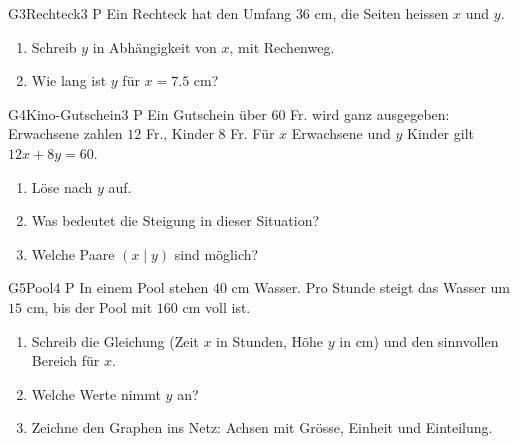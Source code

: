 \documentclass[11pt]{article}
\begin{document}
\begin{lpaufgabe}{G3}{Rechteck}{3 P}
Ein Rechteck hat den Umfang $36$ cm, die Seiten heissen $x$ und $y$.
\begin{enumerate}[label=(\alph*),leftmargin=*,itemsep=3pt]
\item Schreib $y$ in Abhängigkeit von $x$, mit Rechenweg.
\item Wie lang ist $y$ für $x = 7.5$ cm?
\end{enumerate}
\end{lpaufgabe}

\begin{lpaufgabe}{G4}{Kino-Gutschein}{3 P}
Ein Gutschein über $60$ Fr. wird ganz ausgegeben: Erwachsene zahlen $12$ Fr., Kinder $8$ Fr. Für $x$ Erwachsene und $y$ Kinder gilt $12x + 8y = 60$.
\begin{enumerate}[label=(\alph*),leftmargin=*,itemsep=3pt]
\item Löse nach $y$ auf.
\item Was bedeutet die Steigung in dieser Situation?
\item Welche Paare $(x \mid y)$ sind möglich?
\end{enumerate}
\end{lpaufgabe}


\begin{lpaufgabe}{G5}{Pool}{4 P}
In einem Pool stehen $40$ cm Wasser. Pro Stunde steigt das Wasser um $15$ cm, bis der Pool mit $160$ cm voll ist.
\begin{enumerate}[label=(\alph*),leftmargin=*,itemsep=3pt]
\item Schreib die Gleichung (Zeit $x$ in Stunden, Höhe $y$ in cm) und den sinnvollen Bereich für $x$.
\item Welche Werte nimmt $y$ an?
\item Zeichne den Graphen ins Netz: Achsen mit Grösse, Einheit und Einteilung.
\end{enumerate}

\smallskip
\begin{minipage}[t]{0.52\linewidth}\vspace{0pt}
\end{minipage}\hfill
\begin{minipage}[t]{0.45\linewidth}\vspace{0pt}
\end{minipage}
\end{lpaufgabe}
\end{document}
